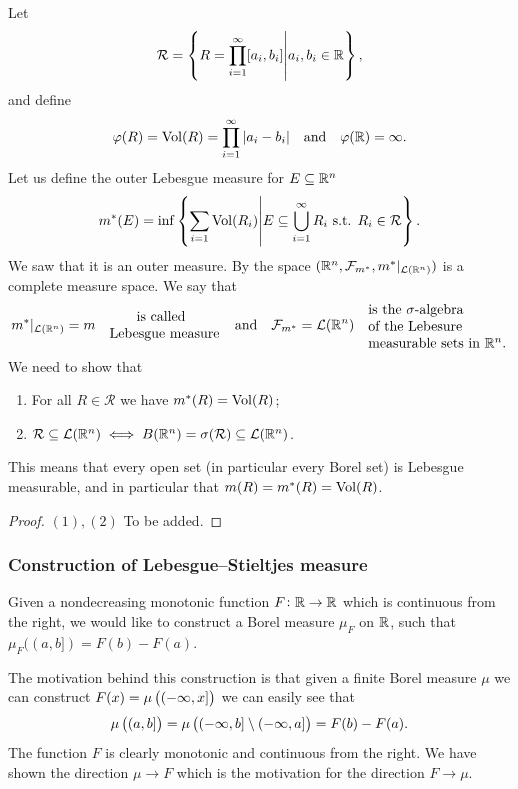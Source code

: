 \documentclass[11pt,a4paper]{article}
\begin{document}
Let
\[
  \mathcal R =
  \left\{R = \prod_{i=1}^{\infty} [a_i,b_i] \middle\vert a_i,b_i \in \mathbb{R}\right\},
\]
and define
\[
  \varphi(R) = \operatorname{Vol}(R) = \prod_{i=1}^{\infty} |a_i - b_i|
  \quad \text{and} \quad
  \varphi(\mathbb{R}) = \infty.
\]
Let us define the outer Lebesgue measure for $E \subseteq \mathbb{R}^n$
\[
  m^*(E) = \inf\left\{\sum_{i=1} \operatorname{Vol}(R_i) \middle\vert
  E \subseteq \bigcup_{i=1}^{\infty} R_i \text{ s.t. } R_i \in \mathcal R\right\}.
\]
We saw that it is an outer measure.
By  the space 
$(\mathbb{R}^n,  \mathcal F_{m^*}, m^*\vert_{\mathcal{L}(\mathbb{R}^n)})$ is a complete measure space.
We say that
\[
  m^*\vert_{\L(\R^n)} = m \quad 
  \parbox{8em}{ \phantom{calle}is called \\ Lebesgue measure}
  \tand
  \mathcal F_{m^*} = \L(\R^n) \quad
  \parbox{10em}{is the $\sigma$-algebra \\ of the Lebesure \\
  measurable sets in $\R^n$.}
\]
We need to show that
\begin{enumerate}
  \item[(1)] For all $R \in \mathcal R$ we have $m^*(R) = \operatorname{Vol}(R)$;
  \item[(2)] $\mathcal R \subseteq \mathcal{L}(\mathbb{R}^n) \iff 
    B(\mathbb{R}^n) = \sigma(\mathcal R) \subseteq \mathcal{L}(\mathbb{R}^n)$.
\end{enumerate}
\begin{remark}
  This means that every open set (in particular every Borel set)
  is Lebesgue measurable, and in particular that $m(R) = m^*(R) = \operatorname{Vol}(R)$.
\end{remark}

\begin{proof}
  $(1), (2)$ To be added.
\end{proof}

\subsubsection{Construction of Lebesgue--Stieltjes measure}
Given a nondecreasing monotonic function $F \colon \mathbb{R} \to \mathbb{R}$ which is
continuous from the right, we would like to construct a Borel measure $\mu_F$
on $\mathbb{R}$, such that $\mu_F((a,b]) = F(b) - F(a)$.

The motivation behind this construction is that given a finite
Borel measure $\mu$ we can construct $F(x) = \mu\del{(\ninfty,x]}$
we can easily see that
\[
  \mu\del{(a,b]} =
  \mu\del{(\ninfty,b] \setminus (\ninfty,a]} = F(b) - F(a).
\]
The function $F$ is clearly monotonic and continuous from the right.
We have shown the direction $\mu \to F$ which is the motivation for
the direction $F \to \mu$.
\end{document}
